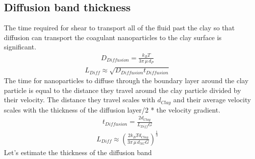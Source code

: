 \documentclass[letterpaper,10pt,english]{sphinxmanual}
\begin{document}
\subsection{Diffusion band thickness}
\label{\detokenize{Rapid_Mix/RM_Theory_and_Future_Work:diffusion-band-thickness}}
The time required for shear to transport all of the fluid past the clay so that diffusion can transport the coagulant nanoparticles to the clay surface is significant.
\begin{equation}\label{equation:Rapid_Mix/RM_Theory_and_Future_Work:Rapid_Mix/RM_Theory_and_Future_Work:33}
\begin{split}D_{Diffusion} = \frac{k_B T}{3 \pi \, \mu \, d_P}\end{split}
\end{equation}\begin{equation}\label{equation:Rapid_Mix/RM_Theory_and_Future_Work:Rapid_Mix/RM_Theory_and_Future_Work:34}
\begin{split}L_{Diff} \approx \sqrt{D_{Diffusion} t_{Diffusion}}\end{split}
\end{equation}
The time for nanoparticles to diffuse through the boundary layer around the clay particle is equal to the distance they travel around the clay particle divided by their velocity. The distance they travel scales with \(d_{Clay}\) and their average velocity scales with the thickness of the diffusion layer/2 * the velocity gradient.
\begin{equation}\label{equation:Rapid_Mix/RM_Theory_and_Future_Work:Rapid_Mix/RM_Theory_and_Future_Work:35}
\begin{split}t_{Diffusion} = \frac{ 2d_{Clay}} {L_{Diff} G}\end{split}
\end{equation}\begin{equation}\label{equation:Rapid_Mix/RM_Theory_and_Future_Work:Rapid_Mix/RM_Theory_and_Future_Work:36}
\begin{split}L_{Diff} \approx \left( \frac{2k_B T d_{Clay}}{3 \pi \,\mu  \, d_{NC} G}\right)^\frac{1}{3}\end{split}
\end{equation}
Let’s estimate the thickness of the diffusion band
\end{document}

